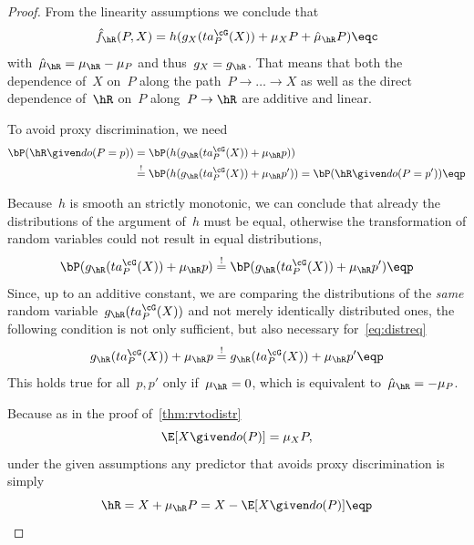 \begin{proof}
  From the linearity assumptions we conclude that
  \begin{equation*}
    \hat{f}_{\hR}(P, X) = h(g_X(ta^{\cG}_P(X)) + \mu_X P + \hat{\mu}_{\hR} P) \eqc
  \end{equation*}
  with~$\hat{\mu}_{\hR} = \mu_{\hR} - \mu_P$ and thus~$g_X = g_{\hR}$. That
  means that both the dependence of~$X$ on~$P$ along the path~$P \to \dots \to
  X$ as well as the direct dependence of~${\hR}$ on~$P$ along~$P \to {\hR}$
  are additive and linear.

  To avoid proxy discrimination, we need
  \begin{subequations}\label{eq:distreq}
  \begin{align}
    \bP ({\hR} \given do(P=p))
    &= \bP(h(g_{\hR}(ta^{\cG}_P(X)) + \mu_{\hR} p)) \\
    &\overset{!}{=} \bP(h(g_{\hR}(ta^{\cG}_P(X)) + \mu_{\hR} p'))
    = \bP ({\hR} \given do(P=p')) \eqp
  \end{align}
  \end{subequations}

  Because~$h$ is smooth an strictly monotonic, we can conclude that already the
  distributions of the argument of~$h$ must be equal, otherwise the
  transformation of random variables could not result in equal distributions,
  \ie{}
  \begin{equation*}
    \bP(g_{\hR}(ta^{\cG}_P(X)) + \mu_{\hR} p)
    \overset{!}{=} \bP(g_{\hR}(ta^{\cG}_P(X)) + \mu_{\hR} p') \eqp
  \end{equation*}
  Since, up to an additive constant, we are comparing the distributions of the
  \emph{same} random variable~$g_{\hR}(ta^{\cG}_P(X))$ and not merely
  identically distributed ones, the following condition is not only
  sufficient, but also necessary for~\eqref{eq:distreq}
  \begin{equation*}
    g_{\hR}(ta^{\cG}_P(X)) + \mu_{\hR} p
    \overset{!}{=} g_{\hR}(ta^{\cG}_P(X)) + \mu_{\hR} p' \eqp
  \end{equation*}
  This holds true for all~$p, p'$ only if~$\mu_{\hR} = 0$, which is equivalent
  to~$\hat{\mu}_{\hR} = - \mu_P$.

  Because as in the proof of~\ref{thm:rvtodistr}
  \begin{equation*}
    \E[X \given do(P)] = \mu_X P,
  \end{equation*}
  under the given assumptions any predictor that avoids proxy discrimination is
  simply
  \begin{equation*}
    {\hR} = X + \mu_{\hR} P = X - \E[X \given do(P)] \eqp
  \end{equation*}\qedhere
\end{proof}
